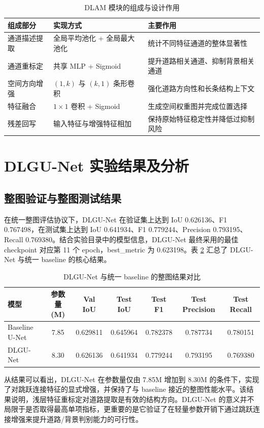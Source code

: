 \begin{table}[htbp]
\centering
\caption{DLAM 模块的组成与设计作用}
\label{tab:v2-dlam-components}
\begin{tabular}{p{3.0cm}p{4.6cm}p{5.1cm}}
\toprule
组成部分 & 实现方式 & 主要作用 \\
\midrule
通道描述提取 & 全局平均池化 + 全局最大池化 & 统计不同特征通道的整体显著性 \\
通道重标定 & 共享 MLP + Sigmoid & 提升道路相关通道、抑制背景相关通道 \\
空间方向增强 & $(1,k)$ 与 $(k,1)$ 条形卷积 & 强化道路方向性和长条结构上下文 \\
特征融合 & $1 \times 1$ 卷积 + Sigmoid & 生成空间权重图并完成位置选择 \\
残差回写 & 输入特征与增强特征相加 & 保持原始特征稳定性并降低过抑制风险 \\
\bottomrule
\end{tabular}
\end{table}

\section{DLGU-Net 实验结果及分析}
\subsection{整图验证与整图测试结果}
在统一整图评估协议下，DLGU-Net 在验证集上达到 IoU 0.626136、F1 0.767498，在测试集上达到 IoU 0.641934、F1 0.779244、Precision 0.793195、Recall 0.769380。结合实验目录中的模型信息，DLGU-Net 最终采用的最佳 checkpoint 对应第 11 个 epoch，best\_metric 为 0.623198。表 \ref{tab:v2-dlgu-main} 汇总了 DLGU-Net 与统一 baseline 的核心结果。

\begin{table}[htbp]
\centering
\caption{DLGU-Net 与统一 baseline 的整图结果对比}
\label{tab:v2-dlgu-main}
\begin{tabular}{lcccccc}
\toprule
模型 & 参数量(M) & Val IoU & Test IoU & Test F1 & Test Precision & Test Recall \\
\midrule
Baseline U-Net & 7.85 & 0.629811 & 0.645964 & 0.782378 & 0.787734 & 0.780151 \\
DLGU-Net & 8.30 & 0.626136 & 0.641934 & 0.779244 & 0.793195 & 0.769380 \\
\bottomrule
\end{tabular}
\end{table}

从结果可以看出，DLGU-Net 在参数量仅由 7.85M 增加到 8.30M 的条件下，实现了对跳跃连接特征的显式增强，并保持了与 baseline 接近的整图性能水平。该结果说明，浅层特征重标定对道路提取是有效的结构方向。DLGU-Net 的意义并不局限于是否取得最高单项指标，更重要的是它验证了在轻量参数开销下通过跳跃连接增强来提升道路/背景判别能力的可行性。

